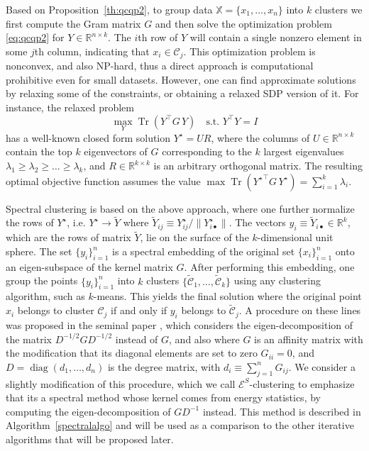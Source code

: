 \documentclass[aps,preprint,nofootinbib,floatfix]{revtex4-1}
\DeclareMathOperator{\diag}{diag}
\DeclareMathOperator{\Tr}{Tr}
\newcommand\C{{\mathcal{C}}}
\newcommand\tC{{\widetilde{\C}}}
\newcommand\Zt{Y}
\begin{document}
Based on Proposition~\ref{th:qcqp2}, to group data
$\mathbb{X} = \{ x_1,\dotsc,x_n \}$
into  $k$ clusters we first compute the Gram matrix
$G$ and then 
solve the optimization problem \eqref{eq:qcqp2} for $\Zt \in
\mathbb{R}^{n\times k}$. The $i$th row
of $\Zt$ will contain a single nonzero element in some $j$th column,
indicating that $x_i \in \C_j$. 
This optimization problem is nonconvex, and also NP-hard,
thus a direct approach 
is computational prohibitive even for small datasets.
However, one can find approximate solutions by relaxing some 
of the constraints, or obtaining a relaxed SDP version of it.
For instance, the relaxed problem
\begin{equation}
\label{eq:relaxed}
\max_{Y} \Tr \left( Y^\top G \, Y \right) \quad \mbox{s.t. $Y^\top Y = I$}
\end{equation}
has a well-known closed form solution $Y^\star = U R$, where the
columns of $U \in \mathbb{R}^{n\times k}$ 
contain the top $k$ eigenvectors of $G$ corresponding
to the $k$ largest eigenvalues $\lambda_1\ge \lambda_2\ge\dotsc\ge\lambda_k$, 
and
$R \in \mathbb{R}^{k\times k}$ is an arbitrary orthogonal matrix. 
The resulting
optimal objective function assumes the value 
$\max \Tr \left( {Y^\star}^\top G \, Y^\star \right)  = 
\sum_{i=1}^k \lambda_i$. 

Spectral clustering is based on the above approach, where
one further normalize the rows of $Y^\star$, 
i.e. $Y^\star \to \widetilde{Y}$ where 
$\widetilde{Y}_{ij} \equiv Y^\star_{ij} \big/ \| Y^\star_{i\bullet} \|$. 
The vectors
$y_i \equiv \widetilde{Y}_{i\bullet} \in \mathbb{R}^k$, which are the
rows of matrix $\widetilde{Y}$, lie on the surface of the $k$-dimensional 
unit sphere.
The set $\{ y_i \}_{i=1}^n$ is a spectral embedding of the original
set $\{ x_i \}_{i=1}^n$ onto an eigen-subspace of the kernel matrix $G$.
After performing this embedding, one group the points 
$\{ y_i \}_{i=1}^n$ into $k$ clusters 
$\{ \tC_1,\dotsc,\tC_k \}$ using any clustering algorithm, such as
$k$-means. This yields the final solution
where the original point $x_i$ belongs
to cluster $\C_j$ if and only if $y_i$ belongs to $\tC_j$.
A procedure on these lines was proposed in the seminal paper
\cite{NgJordan}, which considers the eigen-decomposition of
the matrix $D^{-1/2} G D^{-1/2}$ instead of $G$, and also 
where $G$ is an affinity matrix with the modification that
its diagonal elements are set to zero $G_{ii}=0$, 
and $D=\diag(d_{1},\dotsc,d_{n})$ is the degree matrix, 
with $d_{i} \equiv \sum_{j=1}^n G_{ij}$. 
We consider a slightly modification of this procedure,
which we call \mbox{$\mathcal{E}^{S}$-clustering} 
to emphasize that its a spectral
method whose kernel comes from energy statistics, by 
computing the 
eigen-decomposition of $G D^{-1}$ instead.
This  method is described in 
Algorithm~\ref{spectralalgo} and will be used as a comparison
to the other iterative algorithms 
that will be proposed later.
\end{document}

